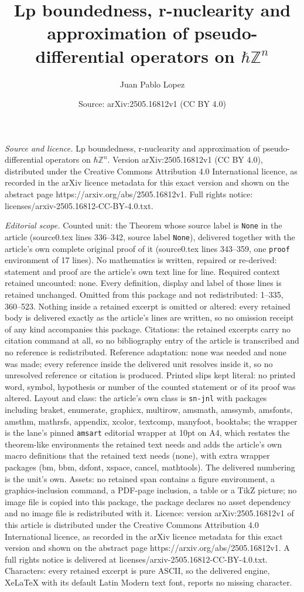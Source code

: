 \documentclass[10pt,a4paper]{amsart}
\title[Lp boundedness, r-nuclearity and approximation of pseudo-dif]{Lp boundedness, r-nuclearity and approximation of pseudo-differential operators on $\hbar\mathbb{Z}^n$}
\author{Juan Pablo Lopez}
\date{Source: arXiv:2505.16812v1 (CC BY 4.0)}
\begin{document}
\maketitle

\noindent\emph{Source and licence.} Lp boundedness, r-nuclearity and approximation of pseudo-differential operators on $\hbar\mathbb{Z}^n$. Version arXiv:2505.16812v1 (CC BY 4.0), distributed under the Creative Commons Attribution 4.0 International licence, as recorded in the arXiv licence metadata for this exact version and shown on the abstract page https://arxiv.org/abs/2505.16812v1. Full rights notice: licenses/arxiv-2505.16812-CC-BY-4.0.txt.\par\smallskip

\noindent\textit{Editorial scope.} Counted unit: the Theorem whose source label is \texttt{None} in the article (source0.tex lines 336--342, source label \texttt{None}), delivered together with the article's own complete original proof of it (source0.tex lines 343--359, one \texttt{proof} environment of 17 lines). No mathematics is written, repaired or re-derived: statement and proof are the article's own text line for line. Required context retained uncounted: none. Every definition, display and label of those lines is retained unchanged. Omitted from this package and not redistributed: 1--335, 360--523. Nothing inside a retained excerpt is omitted or altered: every retained body is delivered exactly as the article's lines are written, so no omission receipt of any kind accompanies this package. Citations: the retained excerpts carry no citation command at all, so no bibliography entry of the article is transcribed and no reference is redistributed. Reference adaptation: none was needed and none was made; every reference inside the delivered unit resolves inside it, so no unresolved reference or citation is produced. Printed slips kept literal: no printed word, symbol, hypothesis or number of the counted statement or of its proof was altered. Layout and class: the article's own class is \texttt{sn-jnl} with packages including braket, enumerate, graphicx, multirow, amsmath, amssymb, amsfonts, amsthm, mathrsfs, appendix, xcolor, textcomp, manyfoot, booktabs; the wrapper is the lane's pinned \texttt{amsart} editorial wrapper at 10pt on A4, which restates the theorem-like environments the retained text needs and adds the article's own macro definitions that the retained text needs (none), with extra wrapper packages (bm, bbm, dsfont, xspace, cancel, mathtools). The delivered numbering is the unit's own. Assets: no retained span contains a figure environment, a graphics-inclusion command, a PDF-page inclusion, a table or a TikZ picture; no image file is copied into this package, the package declares no asset dependency and no image file is redistributed with it. Licence: version arXiv:2505.16812v1 of this article is distributed under the Creative Commons Attribution 4.0 International licence, as recorded in the arXiv licence metadata for this exact version and shown on the abstract page https://arxiv.org/abs/2505.16812v1. A full rights notice is delivered at licenses/arxiv-2505.16812-CC-BY-4.0.txt. Characters: every retained excerpt is pure ASCII, so the delivered engine, XeLaTeX with its default Latin Modern text font, reports no missing character.
\end{document}
